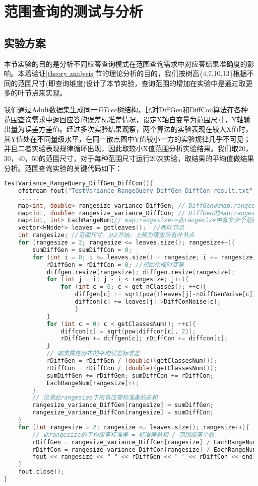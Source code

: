 \section{范围查询的测试与分析}
\subsection{实验方案}

本节实验的目的是分析不同应答查询模式在范围查询需求中对应答结果准确度的影响。本着验证\ref{theory analysis}节的理论分析的目的，我们按树高\{4,7,10,13\}根据不同的范围尺寸(即查询维度)设计了本节实验，查询范围的增加在实验中是通过取更多的叶节点来实现。

我们通过Adult数据集生成同一$DTree$树结构，比对DiffGen和DiffCon算法在各种范围查询需求中返回应答的误差标准差情况，设定X轴自变量为范围尺寸，Y轴输出量为误差方差值。经过多次实验结果观察，两个算法的实验表现在较大X值时，其Y值处在不同量级水平，在同一散点图中Y值较小一方的实验规律几乎不可见；并且二者实验表现规律循环出现，因此取较小X值范围分析实验结果。我们取20，30，40，50的范围尺寸，对于每种范围尺寸运行20次实验，取结果的平均值做结果分析。范围查询实验的关键代码如下：
\begin{lstlisting}[language={C++}, caption={范围查询实验}]
TestVariance_RangeQuery_DiffGen_DiffCon(){
	ofstream fout("TestVariance_RangeQuery_DiffGen_DiffCon_result.txt", ios::app);
	......
	map<int, double> rangesize_variance_DiffGen; // DiffGen的map:rangesize->标准差总和
	map<int, double> rangesize_variance_DiffCon; // DiffGen的map:rangesize->标准差总和
	map<int, int> EachRangeNum;// map:rangesize->此rangesize中有多少个范围应答标准差相加
	vector<HNode*> leaves = getleaves();  //取叶节点
	int rangesize; //范围尺寸，从2开始，上限为覆盖所有叶节点
	for (rangesize = 2; rangesize <= leaves.size(); rangesize++){
		sumDiffGen = sumDiffCon = 0;
		for (int i = 0; i <= leaves.size() - rangesize; i += rangesize){
			rDiffGen = rDiffCon = 0; //初始化临时变量
			diffgen.resize(rangesize); diffgen.resize(rangesize);
			for (int j = i; j - i < rangesize; j++){
				for (int c = 0; c < get_nClasses(); ++c){
					diffgen[c] += sqrt(pow((leaves[j]->DiffGenNoise[c]), 2));
					diffcon[c] += leaves[j]->DiffConNoise[c];
					}	
			}
			for (int c = 0; c < getClassesNum(); ++c){
				diffcon[c] = sqrt(pow(diffcon[c], 2));
				rDiffGen += diffgen[c]; rDiffCon += diffcon[c];
			}
			// 取类属性分布的平均误差标准差
			rDiffGen = rDiffGen / (double)(getClassesNum());
			rDiffCon = rDiffCon / (double)(getClassesNum());
			sumDiffGen += rDiffGen;	sumDiffCon += rDiffCon;
			EachRangeNum[rangesize]++;
		}
		// 记录此rangesize下所有应答标准差的总和
		rangesize_variance_DiffGen[rangesize] = sumDiffGen;
		rangesize_variance_DiffCon[rangesize] = sumDiffCon;
	}
	for (int rangesize = 2; rangesize <= leaves.size(); rangesize++){
		// 此rangesize的平均应答标准差 = 标准差总和 / 范围应答个数
		rDiffGen = rangesize_variance_DiffGen[rangesize] / EachRangeNum[rangesize];
		rDiffCon = rangesize_variance_DiffCon[rangesize] / EachRangeNum[rangesize];
		fout << rangesize << " " << rDiffGen << " " << rDiffCon << endl; // 写入文件
	}
	fout.close();
}
\end{lstlisting}
